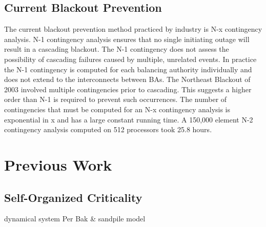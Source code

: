 \section{Current Blackout Prevention}
The current blackout prevention method practiced by industry is N-x contingency analysis. N-1 contingency analysis ensures that no single initiating outage will result in a cascading blackout. The N-1 contingency does not assess the possibility of cascading failures caused by multiple, unrelated events. In practice the N-1 contingency is computed for each balancing authority individually and does not extend to the interconnects between BAs. The Northeast Blackout of 2003 involved multiple contingencies prior to cascading. This suggests a higher order than N-1 is required to prevent such occurrences.\cite{baldick2009vulnerability, liscouski2004final} The number of contingencies that must be computed for an N-x contingency analysis is exponential in x and has a large constant running time. A 150,000 element N-2 contingency analysis computed on 512 processors took 25.8 hours.\cite{huang2009massive}

\chapter{Previous Work}
\section{Self-Organized Criticality}
dynamical system
Per Bak \& sandpile model

